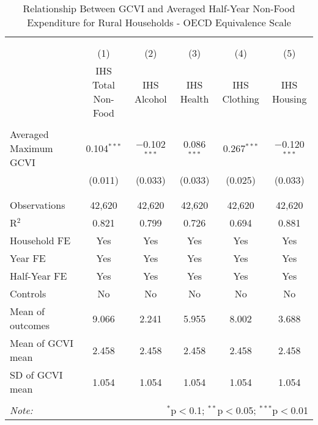 
\begin{table}[!htbp] \centering 
  \caption{Relationship Between GCVI and Averaged Half-Year Non-Food Expenditure for Rural Households - OECD Equivalence Scale} 
  \label{gcvi_table_4_1_rural.tex} 
\normalsize 
\begin{tabular}{@{\extracolsep{5pt}}lccccc} 
\\[-1.8ex]\hline 
\hline \\[-1.8ex] 
\\[-1.8ex] & (1) & (2) & (3) & (4) & (5)\\ 
 & IHS Total Non-Food & IHS Alcohol & IHS Health & IHS Clothing & IHS Housing \\ 
\hline \\[-1.8ex] 
 Averaged Maximum GCVI & 0.104$^{***}$ & $-$0.102$^{***}$ & 0.086$^{***}$ & 0.267$^{***}$ & $-$0.120$^{***}$ \\ 
  & (0.011) & (0.033) & (0.033) & (0.025) & (0.033) \\ 
  & & & & & \\ 
\hline \\[-1.8ex] 
Observations & 42,620 & 42,620 & 42,620 & 42,620 & 42,620 \\ 
R$^{2}$ & 0.821 & 0.799 & 0.726 & 0.694 & 0.881 \\ 
Household FE & Yes & Yes & Yes & Yes & Yes \\ 
Year FE & Yes & Yes & Yes & Yes & Yes \\ 
Half-Year FE & Yes & Yes & Yes & Yes & Yes \\ 
Controls & No & No & No & No & No \\ 
Mean of outcomes & 9.066 & 2.241 & 5.955 & 8.002 & 3.688 \\ 
Mean of GCVI mean & 2.458 & 2.458 & 2.458 & 2.458 & 2.458 \\ 
SD of GCVI mean & 1.054 & 1.054 & 1.054 & 1.054 & 1.054 \\ 
\hline \\[-1.8ex] 
\textit{Note:}  & \multicolumn{5}{r}{$^{*}$p$<$0.1; $^{**}$p$<$0.05; $^{***}$p$<$0.01} \\ 
\end{tabular} 
\end{table} 
